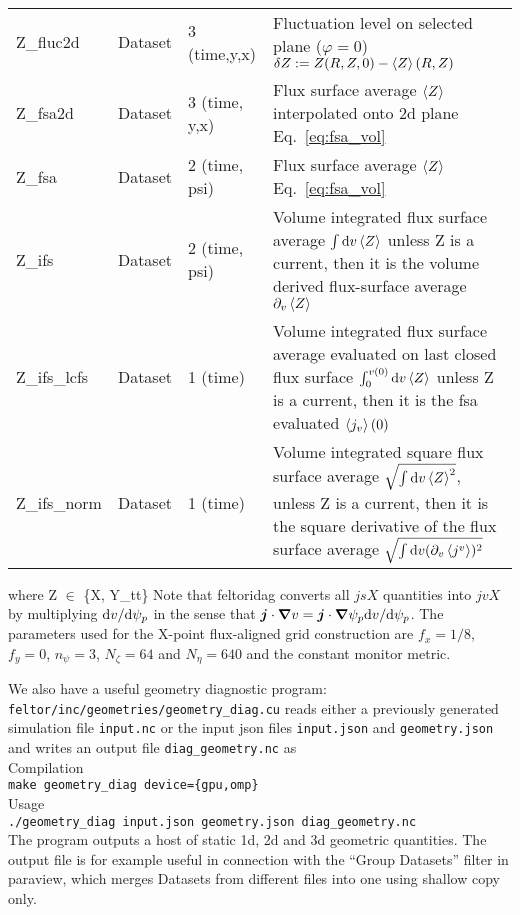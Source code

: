 \begin{longtable}{lll>{\RaggedRight}p{7cm}}
Z\_fluc2d        & Dataset & 3 (time,y,x) & Fluctuation level on selected plane ($\varphi= 0$) $\delta Z := Z(R,Z,0) - \left \langle  Z \right \rangle(R,Z)$ \\
Z\_fsa2d         & Dataset & 3 (time, y,x) & Flux surface average $\left \langle  Z \right \rangle$ interpolated onto 2d plane Eq.~\eqref{eq:fsa_vol} \\
Z\_fsa           & Dataset & 2 (time, psi) & Flux surface average $\left \langle  Z \right \rangle$ Eq.~\eqref{eq:fsa_vol} \\
Z\_ifs           & Dataset & 2 (time, psi) & Volume integrated flux surface average $\int\mathrm{d} v\left \langle  Z \right \rangle$ unless Z is a current, then it is the volume derived flux-surface average $\partial_v \left \langle  Z \right \rangle$ \\
Z\_ifs\_lcfs     & Dataset & 1 (time) & Volume integrated flux surface average evaluated on last closed flux surface $\int_0^{v(0)}\mathrm{d} v\left \langle  Z \right \rangle$ unless Z is a current, then it is the fsa evaluated $\left \langle  j_v \right \rangle(0)$ \\
Z\_ifs\_norm     & Dataset & 1 (time) & Volume integrated square flux surface average $\sqrt{\int \mathrm{d} v \left \langle Z \right \rangle^2}$, unless Z is a current, then it is the square derivative of the flux surface average $\sqrt{\int\mathrm{d} v (\partial_v \left \langle j^v \right \rangle)^2}$\\
\bottomrule
\end{longtable}
where Z $\in$ \{X, Y\_tt\}
Note that feltoridag converts all $jsX$ quantities into $jvX$
by multiplying $\mathrm{d} v/\mathrm{d} \psi_p$
in the sense that ${\boldsymbol{j}}\cdot{\boldsymbol{\nabla}} v  = {\boldsymbol{j}} \cdot{\boldsymbol{\nabla}} \psi_p \mathrm{d} v/\mathrm{d}\psi_p$.
The parameters used for the X-point flux-aligned grid construction are $f_x = 1/8$, $f_y = 0$, $n_\psi = 3$, $N_\zeta = 64$ and $N_\eta = 640$ and the constant monitor metric.

We also have a useful geometry diagnostic program:
\texttt{feltor/inc/geometries/geometry\_diag.cu} reads either a previously
generated simulation file \texttt{input.nc} or the input json files
\texttt{input.json} and \texttt{geometry.json} and writes an output file \texttt{diag\_geometry.nc} as\\
Compilation\\
\texttt{make geometry\_diag device=\{gpu,omp\}} \\
Usage \\
\texttt{./geometry\_diag input.json geometry.json diag\_geometry.nc} \\
The program outputs a host of static 1d, 2d and 3d geometric quantities.
The output file is for example useful in connection with the ``Group Datasets'' filter in paraview, which merges Datasets from different files into one using shallow copy only.
